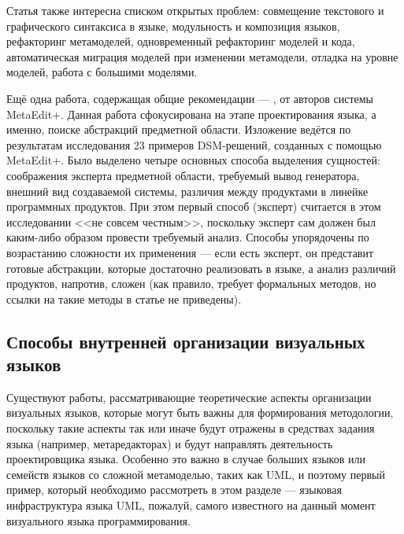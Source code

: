 Статья также интересна списком открытых проблем: совмещение текстового и графического 
синтаксиса в языке, модульность и композиция языков, рефакторинг метамоделей, одновременный 
рефакторинг моделей и кода, автоматическая миграция моделей при изменении метамодели, 
отладка на уровне моделей, работа с большими моделями.

Ещё одна работа, содержащая общие рекомендации --- \cite{luoma2004defining}, от авторов 
системы MetaEdit+. Данная работа сфокусирована на этапе проектирования языка, а именно, 
поиске абстракций предметной области. Изложение ведётся по результатам исследования 
23 примеров \ac{DSM}-решений, созданных с помощью MetaEdit+. Было выделено четыре основных 
способа выделения сущностей: соображения эксперта предметной области, требуемый вывод 
генератора, внешний вид создаваемой системы, различия между продуктами в линейке программных 
продуктов. При этом первый способ (эксперт) считается в этом исследовании <<не совсем 
честным>>, поскольку эксперт сам должен был каким-либо образом провести требуемый 
анализ. Способы упорядочены по возрастанию сложности их применения --- если есть эксперт, 
он представит готовые абстракции, которые достаточно реализовать в языке, а анализ 
различий продуктов, напротив, сложен (как правило, требует формальных методов, но 
ссылки на такие методы в статье не приведены).

\subsection{Способы внутренней организации визуальных языков}
Существуют работы, рассматривающие теоретические аспекты организации визуальных языков, 
которые могут быть важны для формирования методологии, поскольку такие аспекты так 
или иначе будут отражены в средствах задания языка (например, метаредакторах) и будут 
направлять деятельность проектировщика языка. Особенно это важно в случае больших 
языков или семейств языков со сложной метамоделью, таких как UML, и поэтому первый 
пример, который необходимо рассмотреть в этом разделе --- языковая инфраструктура 
языка UML, пожалуй, самого известного на данный момент визуального языка программирования.

